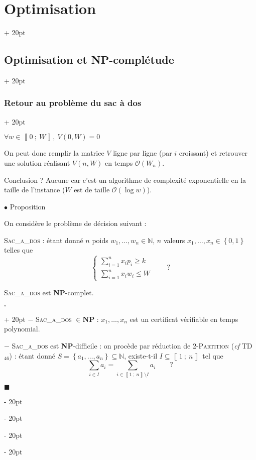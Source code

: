 \documentclass[a4paper, 12pt, twoside]{article}
\newcommand{\N}{\mathbb{N}} %
\newcommand{\nset}[2]{\left\llbracket #1\ ;\ #2 \right\rrbracket}
\newcommand{\set}[1]{\left\{ #1 \right\}}
\renewcommand{\le}{\leqslant}
\renewcommand{\ge}{\geqslant}
\newcommand{\ind}[1][20pt]{\advance\leftskip + #1}
\newcommand{\deind}[1][20pt]{\advance\leftskip - #1}
\newenvironment{indt}[2][20pt]{#2 \par \ind[#1]}{\par \deind} %
\newenvironment{proof}[1][{}]{\begin{indt}{$\square$ #1}}{$\blacksquare$ \end{indt}}
\newcommand{\1}{\mathbbm 1}
\begin{document}
\begin{indt}{\section{Optimisation}}
\begin{indt}{\subsection{Optimisation et \textbf{NP}-complétude}}
\begin{indt}{\subsubsection{Retour au problème du sac à dos}}
                \vspace{12pt}

                $\forall w \in \nset 0 W,\ V(0, W) = 0$

                On peut donc remplir la matrice $V$ ligne par ligne (par $i$ croissant) et retrouver une solution réalisant $V(n, W)$ en temps $\mathcal O(W_n)$.

                Conclusion ? Aucune car c'est un algorithme de complexité exponentielle en la taille de l'instance ($W$ est de taille $\mathcal O(\log w)$).

                \vspace{12pt}
                
                $\bullet$ Proposition

                \begin{emphBox}
                    On considère le problème de décision suivant :

                    \textsc{Sac\_a\_dos} : étant donné $n$ poids $w_1, \ldots, w_n \in \N$, $n$ valeurs $x_1, \ldots, x_n \in \set{0, 1}$ telles que
                    \[
                        \begin{cases}
                            \displaystyle
                            \sum_{i = 1}^n x_i p_i \ge k
                            \\
                            \displaystyle
                            \sum_{i = 1}^n x_i w_i \le W
                        \end{cases}
                        \qquad
                        \text{?}
                    \]

                    \vspace{6pt}
                    
                    \textsc{Sac\_a\_dos} est \textbf{NP}-complet.
                \end{emphBox}

                \vspace{6pt}
                
                \begin{proof}
                    $-$ \textsc{Sac\_a\_dos} $\in \mathbf{NP}$ : $x_1, \ldots, x_n$ est un certificat vérifiable en temps polynomial.

                    \vspace{6pt}
                    
                    $-$ \textsc{Sac\_a\_dos} est \textbf{NP}-difficile : on procède par réduction de $2$-\textsc{Partition} (\textit{cf} TD$_{46}$) : étant donné $S = \set{a_1, \ldots, a_n} \subseteq \N$, existe-t-il $I \subseteq \nset 1 n$ tel que
                    \[
                        \sum_{i \in I} a_i = \sum_{i \in \nset 1 n \setminus I} a_i
                        \qquad \text{?}
                    \]


\end{proof}
\end{indt}
\end{indt}
\end{indt}
\end{document}
